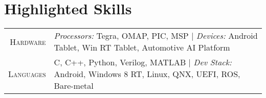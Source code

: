 \documentclass[letter,10pt]{article}
\begin{document}
\section{Highlighted Skills}

\begin{tabular}{r|p{16cm}}

\textsc{Hardware} & \emph{Processors: } Tegra, OMAP, PIC, MSP | \emph{Devices: } Android Tablet, Win RT Tablet, Automotive AI Platform \\%
\textsc{Languages} & C, C++, Python, Verilog, MATLAB | \emph{Dev Stack: } Android, Windows 8 RT, Linux, QNX, UEFI, ROS, Bare-metal\\%

\end{tabular}
\end{document}
